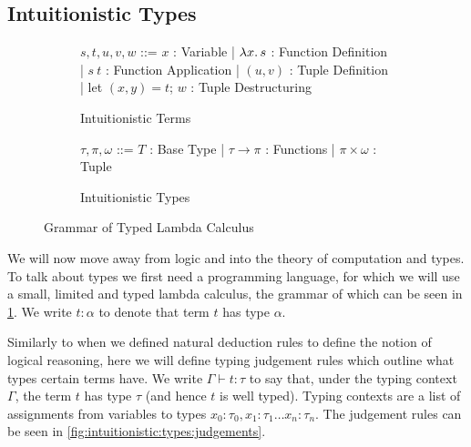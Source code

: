 \documentclass[sigplan,11pt,screen,nonacm]{acmart}
\begin{document}
\subsection{Intuitionistic Types} \label{sec:intuitionistic:types}

\begin{figure}
  \begin{subfigure}{0.58\textwidth}
    \centering
    \begin{bnf}
      \(s,t,u,v,w\) ::= \(x\) : Variable
      | \(\lambda x\ldotp s\) : Function Definition | \(s\ t\) : Function Application
      | \((u, v)\) : Tuple Definition | let \((x, y) = t\); \(w\) : Tuple Destructuring
    \end{bnf}
    \caption{Intuitionistic Terms}
  \end{subfigure}
  \vrule
  \begin{subfigure}{0.38\textwidth}
    \centering
    \begin{bnf}
      \(\tau, \pi, \omega\) ::= \(T\) : Base Type
      | \(\tau \rightarrow \pi\) : Functions
      | \(\pi \times \omega\) : Tuple
    \end{bnf}
    \caption{Intuitionistic Types}
  \end{subfigure}
  \caption{Grammar of Typed Lambda Calculus} \label{fig:intuitionistic:types:grammar}
\end{figure}

We will now move away from logic and into the theory of computation and types. To talk about types we first need a programming language, for which we will use a small, limited and typed lambda calculus, the grammar of which can be seen in \cref{fig:intuitionistic:types:grammar}. We write \(t : \alpha\) to denote that term \(t\) has type \(\alpha\).

Similarly to when we defined natural deduction rules to define the notion of logical reasoning, here we will define typing judgement rules which outline what types certain terms have. We write \(\Gamma \vdash t : \tau\) to say that, under the typing context \(\Gamma\), the term \(t\) has type \(\tau\) (and hence \(t\) is well typed). Typing contexts are a list of assignments from variables to types \(x_0 : \tau_0, x_1 : \tau_1 \dots x_n : \tau_n\). The judgement rules can be seen in \cref{fig:intuitionistic:types:judgements}.
\end{document}
